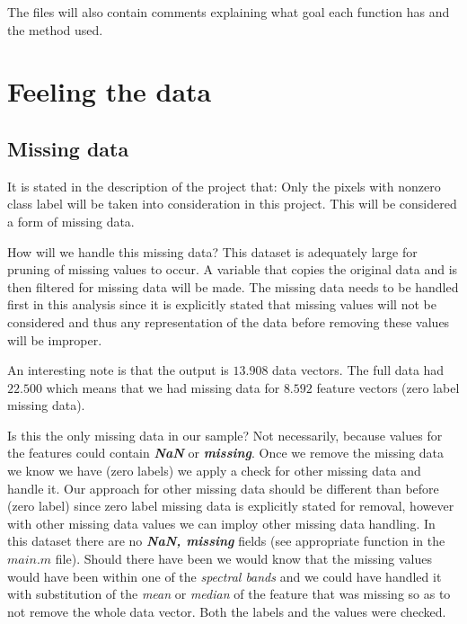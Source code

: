 \documentclass[12pt, a4paper]{article}
\begin{document}
The files will also contain comments explaining what goal each function has and the method used.

\section{Feeling the data}

\subsection{Missing data}

It is stated in the description of the project that: Only the pixels with nonzero class label will be taken into consideration in this project. This will be considered a form of missing data.
\newline

How will we handle this missing data? This dataset is adequately large for pruning of missing values to occur. A variable that copies the original data and is then filtered for missing data will be made. The missing data needs to be handled first in this analysis since it is explicitly stated that missing values will not be considered and thus any representation of the data before removing these values will be improper.
\newline

An interesting note is that the output is $13.908$ data vectors. The full data had $22.500$ which means that we had missing data for $8.592$ feature vectors (zero label missing data).
\newline

Is this the only missing data in our sample? Not necessarily, because values for the features could contain \textbf{\textit{NaN}} or \textbf{\textit{missing}}. Once we remove the missing data we know we have (zero labels) we apply a check for other missing data and handle it. Our approach for other missing data should be different than before (zero label) since zero label missing data is explicitly stated for removal, however with other missing data values we can imploy other missing data handling. In this dataset there are no \textbf{\textit{NaN, missing}} fields (see appropriate function in the $main.m$ file). Should there have been we would know that the missing values would have been within one of the \textit{spectral bands} and we could have handled it with substitution of the \textit{mean} or \textit{median} of the feature that was missing so as to not remove the whole data vector. Both the labels and the values were checked.
\end{document}
